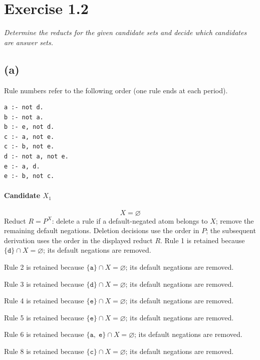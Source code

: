 \documentclass[a4paper,11pt]{article}
\newif\ifexplain
\newcommand{\explain}[1]{\ifexplain\begin{erklbox}#1\end{erklbox}\fi}
\newcommand{\angabe}[1]{\textit{#1}\par}
\newcommand{\aufgabe}[1]{\section*{Exercise #1}}
\newcommand{\teil}[1]{\subsection*{(#1)}}
\newcommand{\at}[1]{\texttt{#1}}
\begin{document}
\explain{Die Probe besteht aus zwei Teilen: Jede aufgenommene Aussage hat oben eine passende Regel. Am Ende kann keine Regel ein weiteres Atom hinzufügen. Damit ist die Menge ein Modell und zugleich das kleinste Modell.}
\aufgabe{1.2}
\angabe{Determine the reducts for the given candidate sets and decide which candidates are answer sets.}
\teil{a}
Rule numbers refer to the following order (one rule ends at each period).
\begin{small}
\begin{verbatim}
a :- not d.
b :- not a.
b :- e, not d.
c :- a, not e.
c :- b, not e.
d :- not a, not e.
e :- a, d.
e :- b, not c.
\end{verbatim}
\end{small}
\paragraph{Candidate $X_1$}
\[
X=\varnothing
\]
Reduct $R=P^X$: delete a rule if a default-negated atom belongs to $X$; remove the remaining default negations. Deletion decisions use the order in $P$; the subsequent derivation uses the order in the displayed reduct $R$.
Rule 1 is retained because $\{\at{d}\}\cap X=\varnothing$; its default negations are removed.

Rule 2 is retained because $\{\at{a}\}\cap X=\varnothing$; its default negations are removed.

Rule 3 is retained because $\{\at{d}\}\cap X=\varnothing$; its default negations are removed.

Rule 4 is retained because $\{\at{e}\}\cap X=\varnothing$; its default negations are removed.

Rule 5 is retained because $\{\at{e}\}\cap X=\varnothing$; its default negations are removed.

Rule 6 is retained because $\{\at{a},\;\at{e}\}\cap X=\varnothing$; its default negations are removed.

Rule 8 is retained because $\{\at{c}\}\cap X=\varnothing$; its default negations are removed.
\end{document}
